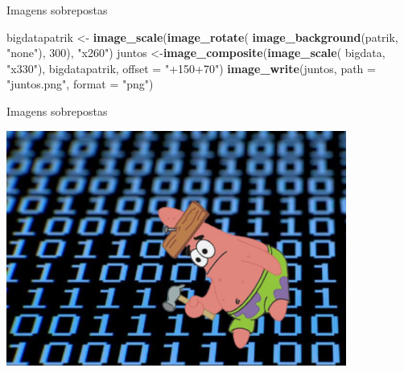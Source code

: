 \documentclass[
  ignorenonframetext,
]{beamer}
\newenvironment{Shaded}{\begin{snugshade}}{\end{snugshade}}
\newcommand{\DataTypeTok}[1]{\textcolor[rgb]{0.13,0.29,0.53}{#1}}
\newcommand{\DecValTok}[1]{\textcolor[rgb]{0.00,0.00,0.81}{#1}}
\newcommand{\KeywordTok}[1]{\textcolor[rgb]{0.13,0.29,0.53}{\textbf{#1}}}
\newcommand{\NormalTok}[1]{#1}
\newcommand{\StringTok}[1]{\textcolor[rgb]{0.31,0.60,0.02}{#1}}
\begin{document}
\begin{frame}[fragile]{Imagens sobrepostas}
\protect\hypertarget{imagens-sobrepostas-2}{}

\begin{Shaded}
\begin{Highlighting}[]
\NormalTok{bigdatapatrik <-}\StringTok{ }\KeywordTok{image_scale}\NormalTok{(}\KeywordTok{image_rotate}\NormalTok{(}
  \KeywordTok{image_background}\NormalTok{(patrik, }\StringTok{"none"}\NormalTok{), }\DecValTok{300}\NormalTok{), }\StringTok{"x260"}\NormalTok{)}
\NormalTok{juntos <-}\KeywordTok{image_composite}\NormalTok{(}\KeywordTok{image_scale}\NormalTok{(}
\NormalTok{  bigdata, }\StringTok{"x330"}\NormalTok{), bigdatapatrik, }\DataTypeTok{offset =} \StringTok{"+150+70"}\NormalTok{)}
\KeywordTok{image_write}\NormalTok{(juntos, }\DataTypeTok{path =} \StringTok{"juntos.png"}\NormalTok{, }\DataTypeTok{format =} \StringTok{"png"}\NormalTok{)}
\end{Highlighting}
\end{Shaded}

\end{frame}

\begin{frame}{Imagens sobrepostas}
\protect\hypertarget{imagens-sobrepostas-3}{}

\small

\includegraphics[width=4.4in]{juntos}

\begin{center}
\tiny{}
\end{center}

\end{frame}
\end{document}
